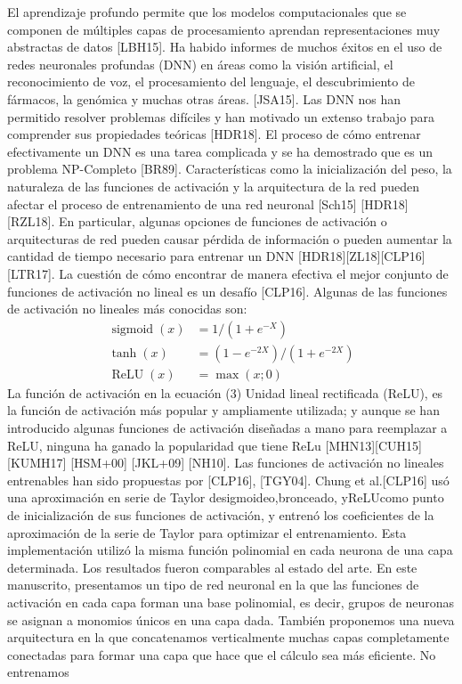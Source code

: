 \documentclass[10pt]{article}
\begin{document}
El aprendizaje profundo permite que los modelos computacionales que se componen de múltiples capas de procesamiento aprendan representaciones muy abstractas de datos [LBH15]. Ha habido informes de muchos éxitos
en el uso de redes neuronales profundas (DNN) en áreas como la visión artificial, el reconocimiento de voz, el procesamiento del lenguaje, el descubrimiento de fármacos, la genómica y muchas otras áreas. [JSA15]. Las DNN nos han permitido resolver problemas difíciles y han motivado un extenso trabajo para comprender sus propiedades teóricas [HDR18].
El proceso de cómo entrenar efectivamente un DNN es una tarea complicada y se ha demostrado que es un problema NP-Completo [BR89]. Características como la inicialización del peso, la naturaleza de las funciones de activación y la arquitectura de la red pueden afectar el proceso de entrenamiento de una red
neuronal [Sch15] [HDR18] [RZL18]. En particular, algunas opciones de funciones de activación o arquitecturas de red pueden causar pérdida de información o pueden aumentar la cantidad de tiempo necesario para
entrenar un DNN [HDR18][ZL18][CLP16][LTR17]. La cuestión de cómo encontrar de manera efectiva el mejor conjunto de funciones de activación no lineal es un desafío [CLP16]. Algunas de las funciones de activación no lineales más conocidas son:
$$
\begin{aligned}
\operatorname{sigmoid}(x) &=1 /\left(1+e^{-X}\right) \\
\tanh (x) &=\left(1-e^{-2 X}\right) /\left(1+e^{-2 X}\right) \\
\operatorname{ReLU}(x) &=\max (x ; 0)
\end{aligned}
$$
La función de activación en la ecuación (3) Unidad lineal rectificada (ReLU), es la función de activación más popular y ampliamente utilizada; y aunque se han introducido algunas funciones de activación diseñadas a mano para reemplazar a ReLU, ninguna ha ganado la popularidad que tiene ReLu [MHN13][CUH15] [KUMH17] [HSM+00] [JKL+09] [NH10]. Las funciones de activación no lineales entrenables han sido propuestas por [CLP16], [TGY04]. Chung et al.[CLP16] usó una aproximación en serie de Taylor desigmoideo,bronceado, yReLUcomo punto de inicialización de sus funciones de activación, y entrenó los coeficientes de la aproximación de la serie de Taylor para optimizar el entrenamiento. Esta implementación utilizó la misma función polinomial en cada neurona de una capa determinada. Los resultados fueron comparables al estado del arte. En este manuscrito, presentamos un tipo de red neuronal en la que las funciones de activación en cada capa forman una base polinomial, es decir, grupos de neuronas se asignan a monomios únicos en una capa dada. También proponemos una nueva arquitectura en la que concatenamos verticalmente muchas capas completamente conectadas para formar una capa que hace que el cálculo sea más eficiente. No entrenamos
\end{document}

